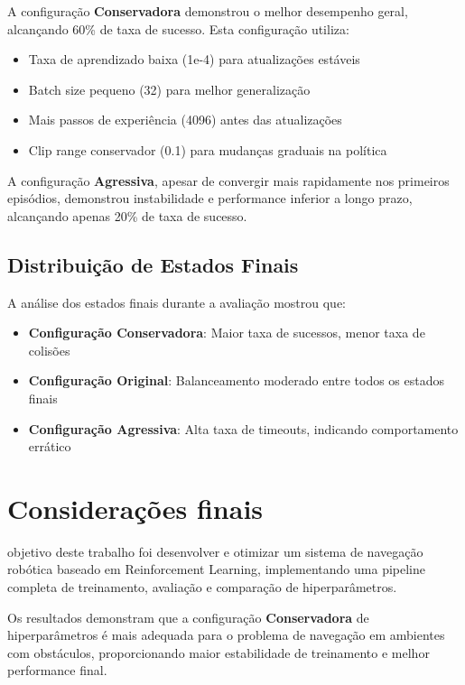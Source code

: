 \documentclass[9pt,a4paper,twoside]{tau}
\begin{document}
A configuração \textbf{Conservadora} demonstrou o melhor desempenho geral, alcançando 60\% de taxa de sucesso. Esta configuração utiliza:
\begin{itemize}
    \item Taxa de aprendizado baixa (1e-4) para atualizações estáveis
    \item Batch size pequeno (32) para melhor generalização
    \item Mais passos de experiência (4096) antes das atualizações
    \item Clip range conservador (0.1) para mudanças graduais na política
\end{itemize}

A configuração \textbf{Agressiva}, apesar de convergir mais rapidamente nos primeiros episódios, demonstrou instabilidade e performance inferior a longo prazo, alcançando apenas 20\% de taxa de sucesso.

\subsection{Distribuição de Estados Finais}

A análise dos estados finais durante a avaliação mostrou que:
\begin{itemize}
    \item \textbf{Configuração Conservadora}: Maior taxa de sucessos, menor taxa de colisões
    \item \textbf{Configuração Original}: Balanceamento moderado entre todos os estados finais
    \item \textbf{Configuração Agressiva}: Alta taxa de timeouts, indicando comportamento errático
\end{itemize}

\section{Considerações finais}

 objetivo deste trabalho foi desenvolver e otimizar um sistema de navegação robótica baseado em Reinforcement Learning, implementando uma pipeline completa de treinamento, avaliação e comparação de hiperparâmetros.

Os resultados demonstram que a configuração \textbf{Conservadora} de hiperparâmetros é mais adequada para o problema de navegação em ambientes com obstáculos, proporcionando maior estabilidade de treinamento e melhor performance final.
\end{document}
